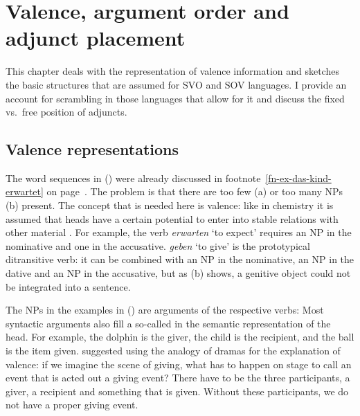 \chapter{Valence, argument order and adjunct placement}
\label{chap-valence}


This chapter deals with the representation of valence information and sketches the basic structures that
are assumed for SVO and SOV languages. I provide an account for scrambling in those languages that
allow for it and discuss the fixed vs.\ free position of adjuncts.

\section{Valence representations}
\label{sec-valence}

The word sequences in () were already discussed in footnote~\ref{fn-ex-das-kind-erwartet} on
page~\pageref{fn-ex-das-kind-erwartet}.
\eal
{}
\zl
The problem is that there are too few (a) or too many NPs (b) present. The concept
that is needed here is valence: like in chemistry it is assumed that heads have a certain potential
to enter into stable relations with other material \citep[]{Tesniere2015a-u}. For example,
the verb \emph{erwarten} `to expect' requires an NP in the nominative and one in the
accusative. \emph{geben} `to give' is the prototypical ditransitive verb: it can be combined with an
NP in the nominative, an NP in the dative and an NP in the accusative, but as (b) shows, a
genitive object could not be integrated into a sentence. 

The NPs in the examples in () are arguments of the respective verbs:
\eal
{}
\zl
Most syntactic arguments also fill a so-called  in the semantic representation of the
head. For example, the dolphin is the giver, the child is the recipient, and the ball is the item
given. \citet[Chapter~48]{Tesniere2015a-u} suggested using the analogy of dramas for the explanation of valence: if we
imagine the scene of giving, what has to happen on stage to call an event that is acted out a giving
event? There have to be the three participants, a giver, a recipient and something that is
given. Without these participants, we do not have a proper giving event. 

